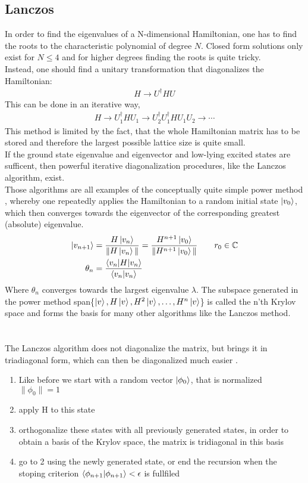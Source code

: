 \documentclass{article}
\begin{document}
\subsection{Lanczos}
In order to find the eigenvalues of a N-dimensional Hamiltonian, one
has to find the roots to the characteristic polynomial of degree
$N$. Closed form solutions only exist for $ N\leq 4$ and for higher degrees
finding the roots is quite tricky.\\
Instead, one should find a unitary transformation that diagonalizes
the Hamiltonian:
\begin{align*}
H \to U^{\dagger} H U
\end{align*}
This can be done in an iterative way,
\begin{align*}
H \to U_1^{\dagger} H U_1 \to U_2^{\dagger}U_1^{\dagger} H U_1U_2 \to \dotsm
\end{align*}
This method is limited by the fact, that the whole Hamiltonian matrix
has to be stored and therefore the largest possible lattice size is
quite small.\\
If the ground state eigenvalue and eigenvector and low-lying excited
states are sufficent, then powerful iterative diagonalization
procedures, like the Lanczos algorithm, exist.\\
Those algorithms are all examples of the conceptually quite simple
power method \cite{Noack},
whereby one repeatedly applies the Hamiltonian to a random initial
state $\ket{v_0}$, which then converges towards the eigenvector of the
corresponding greatest (absolute) eigenvalue.
\begin{align*}
\ket{v_{n+1}} &= \frac{H \ket{v_n}}{\| H \ket{v_n} \|} =\frac{H^{n+1} \ket{v_0}}{\| H^{n+1} \ket{v_0} \|}  \qquad r_0 \in \mathbb{C}\\
\theta_n &= \frac{\braket{v_n|H|v_n}}{\braket{v_n|v_n}}
\end{align*}
Where $\theta_n$ converges towards the largest eigenvalue $\lambda$. The
subspace generated in the power method
 span\{$\ket{v},H \ket{v}, H^2 \ket{v}, \dotsc,H^n \ket{v}$\} 
is called the n'th Krylov space and forms the basis for many other
algorithms like the Lanczos method.\\
\\
\\
The Lanczos algorithm does not diagonalize the matrix, but brings it
in  triadiagonal form, which can then be diagonalized much easier \cite{Fehske}.
\begin{enumerate}
\item\label{item:1} Like before we start with a random vector
  $\ket{\phi_0}$, that is normalized\\
 $\|\phi_0\| = 1$
\item\label{item:2} apply H to this state
\item\label{item:3} orthogonalize these states with all previously
  generated states, in order to
  obtain a basis of the Krylov space, the matrix is tridiagonal in this basis
\item\label{item:4} go to 2 using the newly generated state, or end the
  recursion when the stoping criterion $\braket{\phi_{n+1}|\phi_{n+1}}
  < \epsilon$ is fullfiled 

\end{enumerate}
\end{document}
